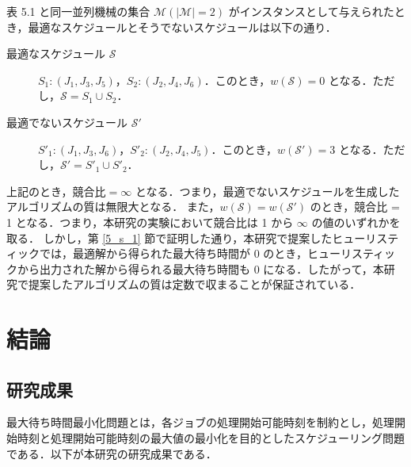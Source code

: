\documentclass[12pt]{optlab-bachelor}
\begin{document}
表 5.1 と同一並列機械の集合 $\mathcal{M} (|\mathcal{M}| = 2)$ がインスタンスとして与えられたとき，最適なスケジュールとそうでないスケジュールは以下の通り．
\begin{description}
  \item[最適なスケジュール $\mathcal{S}$] $S_1 : (J_1, J_3, J_5)$，$S_2 : (J_2, J_4, J_6)$．このとき，$w(\mathcal{S}) = 0$ となる．ただし，$\mathcal{S} = S_1 \cup S_2$．
  \item[最適でないスケジュール $\mathcal{S}'$] $S'_1 : (J_1, J_3, J_6)$，$S'_2 : (J_2, J_4, J_5)$．このとき，$w(\mathcal{S}') = 3$ となる．ただし，$\mathcal{S}' = S'_1 \cup S'_2$．
\end{description}

上記のとき，$\text{競合比} = \infty$ となる．つまり，最適でないスケジュールを生成したアルゴリズムの質は無限大となる．
また，$w(\mathcal{S}) = w(\mathcal{S}')$ のとき，競合比 = 1 となる．つまり，本研究の実験において競合比は 1 から $\infty$ の値のいずれかを取る．
しかし，第 \ref{5_s_1} 節で証明した通り，本研究で提案したヒューリスティックでは，最適解から得られた最大待ち時間が 0 のとき，ヒューリスティックから出力された解から得られる最大待ち時間も 0 になる．したがって，本研究で提案したアルゴリズムの質は定数で収まることが保証されている．

\chapter{結論}\label{c_6}
\section{研究成果}
最大待ち時間最小化問題とは，各ジョブの処理開始可能時刻を制約とし，処理開始時刻と処理開始可能時刻の最大値の最小化を目的としたスケジューリング問題である．以下が本研究の研究成果である．
\end{document}
